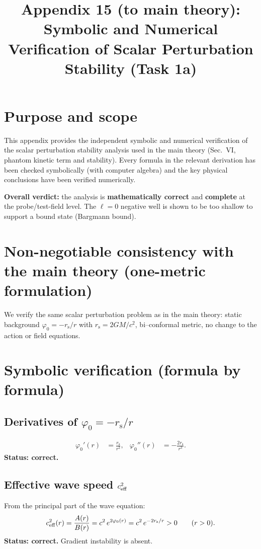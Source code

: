 \documentclass[11pt]{article}
\title{Appendix 15 (to main theory): Symbolic and Numerical Verification of Scalar Perturbation Stability (Task 1a)}
\author{}
\date{}
\newcommand{\rs}{r_{\mathrm{s}}}
\begin{document}
\let\phi\varphi
\maketitle

\section*{Purpose and scope}
This appendix provides the independent symbolic and numerical verification of the scalar perturbation stability analysis used in the main theory (Sec.~VI, phantom kinetic term and stability). Every formula in the relevant derivation has been checked symbolically (with computer algebra) and the key physical conclusions have been verified numerically.

\textbf{Overall verdict:} the analysis is \textbf{mathematically correct} and \textbf{complete} at the probe/test-field level. The $\ell=0$ negative well is shown to be too shallow to support a bound state (Bargmann bound).

\section*{Non-negotiable consistency with the main theory (one-metric formulation)}
We verify the same scalar perturbation problem as in the main theory: static background $\phi_0=-\rs/r$ with $\rs=2GM/c^2$, bi--conformal metric, no change to the action or field equations.

\section{Symbolic verification (formula by formula)}
\label{sec:symbolic}

\subsection{Derivatives of $\phi_0=-\rs/r$}
\begin{align}
\phi_0'(r)&=\frac{\rs}{r^2}, &
\phi_0''(r)&=-\frac{2\rs}{r^3}.
\end{align}
\textbf{Status: \checkmark\; correct.}

\subsection{Effective wave speed $c_{\rm eff}^2$}
From the principal part of the wave equation:
\begin{equation}
c_{\rm eff}^2(r)=\frac{A(r)}{B(r)}
=c^2\,e^{2\phi_0(r)}=c^2\,e^{-2\rs/r}>0
\qquad(r>0).
\end{equation}
\textbf{Status: \checkmark\; correct.}  Gradient instability is absent.
\end{document}
